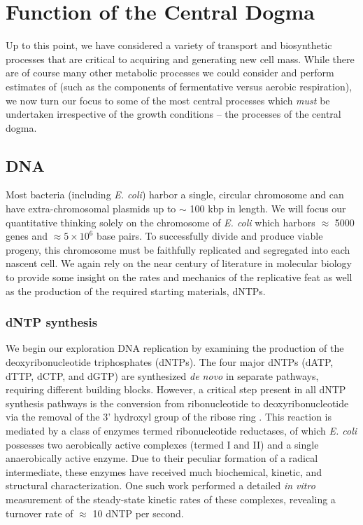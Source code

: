 \section{Function of the Central Dogma}
Up to this point, we have considered a variety of transport and biosynthetic
processes that are critical to acquiring and generating new cell mass. While
there are of course many other metabolic processes we could consider and
perform estimates of (such as the components of fermentative versus aerobic
respiration), we now turn our focus to some of the most central processes
which \textit{must} be undertaken irrespective of the growth conditions --
the processes of the central dogma.


\subsection{DNA}
Most bacteria (including \textit{E. coli}) harbor a single, circular chromosome
and can have extra-chromosomal plasmids up to $\sim$ 100 kbp in length. We will focus
our quantitative thinking solely on the chromosome of \textit{E. coli} which
harbors $\approx$ 5000 genes and $\approx 5\times 10^6$ base pairs. To
successfully divide and produce viable progeny, this chromosome must be
faithfully replicated and segregated into each nascent cell. We again rely on
the near century of literature in molecular biology to provide some insight on
the rates and mechanics of the replicative feat as well as the production of the
required starting materials, dNTPs.

\subsubsection{dNTP synthesis}
We begin our exploration DNA replication by examining the
production of the deoxyribonucleotide triphosphates (dNTPs). The four major
dNTPs (dATP, dTTP, dCTP, and dGTP) are synthesized \textit{de novo} in separate
pathways, requiring different building blocks. However, a critical step present
in all dNTP synthesis pathways is the conversion from ribonucleotide to
deoxyribonucleotide via the removal of the 3' hydroxyl group of the ribose ring
\citep{rudd2016}. This reaction is mediated by a class of enzymes termed
ribonucleotide reductases, of which \textit{E. coli} possesses two aerobically
active complexes (termed I and II) and a single anaerobically active enzyme. Due
to their peculiar formation of a radical intermediate, these enzymes have
received much biochemical, kinetic, and structural characterization.  One such
work \citep{ge2003} performed a detailed \textit{in vitro} measurement of the
steady-state kinetic rates of these complexes, revealing a turnover rate of
$\approx$ 10 dNTP per second.

